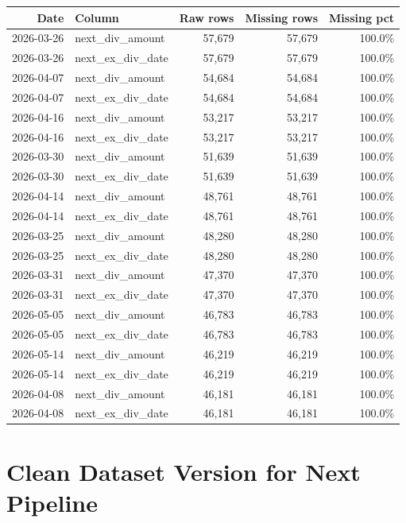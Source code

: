 \documentclass[11pt]{article}
\begin{document}
\begingroup
\scriptsize
\begin{longtable}{rlrrr}
\toprule
Date & Column & Raw rows & Missing rows & Missing pct \\
\midrule
2026-03-26 & next\_div\_amount & 57,679 & 57,679 & 100.0\% \\
2026-03-26 & next\_ex\_div\_date & 57,679 & 57,679 & 100.0\% \\
2026-04-07 & next\_div\_amount & 54,684 & 54,684 & 100.0\% \\
2026-04-07 & next\_ex\_div\_date & 54,684 & 54,684 & 100.0\% \\
2026-04-16 & next\_div\_amount & 53,217 & 53,217 & 100.0\% \\
2026-04-16 & next\_ex\_div\_date & 53,217 & 53,217 & 100.0\% \\
2026-03-30 & next\_div\_amount & 51,639 & 51,639 & 100.0\% \\
2026-03-30 & next\_ex\_div\_date & 51,639 & 51,639 & 100.0\% \\
2026-04-14 & next\_div\_amount & 48,761 & 48,761 & 100.0\% \\
2026-04-14 & next\_ex\_div\_date & 48,761 & 48,761 & 100.0\% \\
2026-03-25 & next\_div\_amount & 48,280 & 48,280 & 100.0\% \\
2026-03-25 & next\_ex\_div\_date & 48,280 & 48,280 & 100.0\% \\
2026-03-31 & next\_div\_amount & 47,370 & 47,370 & 100.0\% \\
2026-03-31 & next\_ex\_div\_date & 47,370 & 47,370 & 100.0\% \\
2026-05-05 & next\_div\_amount & 46,783 & 46,783 & 100.0\% \\
2026-05-05 & next\_ex\_div\_date & 46,783 & 46,783 & 100.0\% \\
2026-05-14 & next\_div\_amount & 46,219 & 46,219 & 100.0\% \\
2026-05-14 & next\_ex\_div\_date & 46,219 & 46,219 & 100.0\% \\
2026-04-08 & next\_div\_amount & 46,181 & 46,181 & 100.0\% \\
2026-04-08 & next\_ex\_div\_date & 46,181 & 46,181 & 100.0\% \\
\bottomrule
\end{longtable}
\endgroup

\section*{Clean Dataset Version for Next Pipeline}
\end{document}
